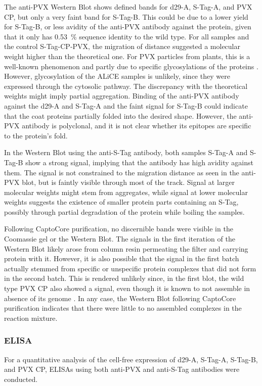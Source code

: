 The anti-PVX Western Blot shows defined bands for d29-A, S-Tag-A, and PVX CP, but only a very faint band for S-Tag-B. This could be due to a lower yield for S-Tag-B, or less avidity of the anti-PVX antibody against the protein, given that it only has \SI{0.53}{\percent} sequence identity to the wild type. For all samples and the control S-Tag-CP-PVX, the migration of distance suggested a molecular weight higher than the theoretical one. For PVX particles from plants, this is a well-known phenomenon and partly due to specific glycosylations of the proteins \cite{pvx_glycosylation}. However, glycosylation of the ALiCE samples is unlikely, since they were expressed through the cytosolic pathway. The discrepancy with the theoretical weights might imply partial aggregation. Binding of the anti-PVX antibody against the d29-A and S-Tag-A and the faint signal for S-Tag-B could indicate that the coat proteins partially folded into the desired shape. However, the anti-PVX antibody is polyclonal, and it is not clear whether its epitopes are specific to the protein's fold. 

In the Western Blot using the anti-S-Tag antibody, both samples S-Tag-A and S-Tag-B show a strong signal, implying that the antibody has high avidity against them. The signal is not constrained to the migration distance as seen in the anti-PVX blot, but is faintly visible through most of the track. Signal at larger molecular weights might stem from aggregates, while signal at lower molecular weights suggests the existence of smaller protein parts containing an S-Tag, possibly through partial degradation of the protein while boiling the samples. 

Following CaptoCore purification, no discernible bands were visible in the Coomassie gel or the Western Blot. The signals in the first iteration of the Western Blot likely arose from column resin permeating the filter and carrying protein with it. However, it is also possible that the signal in the first batch actually stemmed from specific or unspecific protein complexes that did not form in the second batch. This is rendered unlikely since, in the first blot, the wild type PVX CP also showed a signal, even though it is known to not assemble in absence of its genome \cite{juli_sagt_keine_assembly}. In any case, the Western Blot following CaptoCore purification indicates that there were little to no assembled complexes in the reaction mixture. 

\subsubsection{ELISA}
For a quantitative analysis of the cell-free expression of d29-A, S-Tag-A, S-Tag-B, and PVX CP, ELISAs using both anti-PVX and anti-S-Tag antibodies were conducted. 

